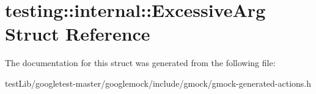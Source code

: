 \hypertarget{structtesting_1_1internal_1_1ExcessiveArg}{}\section{testing\+:\+:internal\+:\+:Excessive\+Arg Struct Reference}
\label{structtesting_1_1internal_1_1ExcessiveArg}


The documentation for this struct was generated from the following file\+:\begin{DoxyCompactItemize}
\item 
test\+Lib/googletest-\/master/googlemock/include/gmock/gmock-\/generated-\/actions.\+h\end{DoxyCompactItemize}
